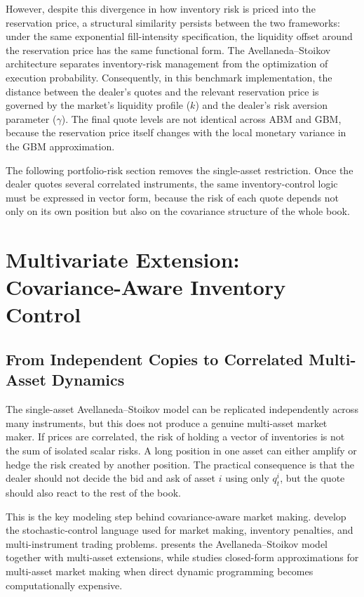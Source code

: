 However, despite this divergence in how inventory risk is priced into the reservation price, a structural similarity persists between the two frameworks: under the same exponential fill-intensity specification, the liquidity offset around the reservation price has the same functional form. The Avellaneda--Stoikov architecture separates inventory-risk management from the optimization of execution probability. Consequently, in this benchmark implementation, the distance between the dealer's quotes and the relevant reservation price is governed by the market's liquidity profile ($k$) and the dealer's risk aversion parameter ($\gamma$). The final quote levels are not identical across ABM and GBM, because the reservation price itself changes with the local monetary variance in the GBM approximation.

The following portfolio-risk section removes the single-asset restriction. Once the dealer quotes several correlated instruments, the same inventory-control logic must be expressed in vector form, because the risk of each quote depends not only on its own position but also on the covariance structure of the whole book.

\section{Multivariate Extension: Covariance-Aware Inventory Control}


\subsection{From Independent Copies to Correlated Multi-Asset Dynamics}

The single-asset Avellaneda--Stoikov model can be replicated independently across many instruments, but this does not produce a genuine multi-asset market maker. If prices are correlated, the risk of holding a vector of inventories is not the sum of isolated scalar risks. A long position in one asset can either amplify or hedge the risk created by another position. The practical consequence is that the dealer should not decide the bid and ask of asset $i$ using only $q_t^i$, but the quote should also react to the rest of the book.

This is the key modeling step behind covariance-aware market making. \textcite{CarteaJaimungalPenalva2015} develop the stochastic-control language used for market making, inventory penalties, and multi-instrument trading problems. \textcite{Gueant2016} presents the Avellaneda--Stoikov model together with multi-asset extensions, while \textcite{BergaultEvangelistaGueantVieira2022} studies closed-form approximations for multi-asset market making when direct dynamic programming becomes computationally expensive.


